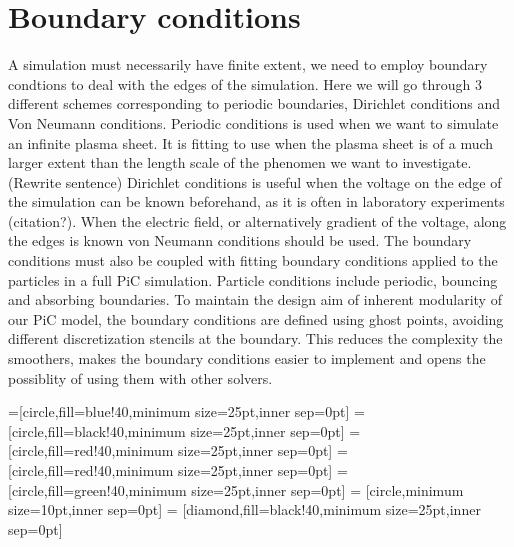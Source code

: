 \section{Boundary conditions}
	\label{sec:bnd_method}
	A simulation must necessarily have finite extent, we need to employ boundary condtions
	to deal with the edges of the simulation. Here we will go through \(3\) different schemes
	corresponding to periodic boundaries, Dirichlet conditions and Von Neumann conditions.
	Periodic conditions is used when we want to simulate an infinite plasma sheet.
	It is fitting to use when the plasma sheet is of a much larger extent than the
	length scale of the phenomen we want to investigate. (Rewrite sentence)
	Dirichlet conditions is useful when the voltage on the edge of the simulation
	can be known beforehand, as it is often in laboratory experiments (citation?).
	When the electric field, or alternatively gradient of the voltage, along the edges is known
	von Neumann conditions should be used. The boundary conditions must also be coupled
	with fitting boundary conditions applied to the particles in a full PiC simulation.
	Particle conditions include periodic, bouncing and absorbing boundaries.
	To maintain the design aim of inherent modularity of our PiC model, the boundary conditions
	are defined using ghost points, avoiding different discretization stencils at
	the boundary. This reduces the complexity the smoothers, makes the boundary
	conditions easier to implement and opens the possiblity of using them with other
	solvers.

	=[circle,fill=blue!40,minimum size=25pt,inner sep=0pt]
	=[circle,fill=black!40,minimum size=25pt,inner sep=0pt]
	 = [circle,fill=red!40,minimum size=25pt,inner sep=0pt]
	 = [circle,fill=red!40,minimum size=25pt,inner sep=0pt]
	 = [circle,fill=green!40,minimum size=25pt,inner sep=0pt]
	 = [circle,minimum size=10pt,inner sep=0pt]
	 = [diamond,fill=black!40,minimum size=25pt,inner sep=0pt]

